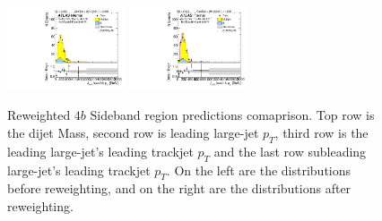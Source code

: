 \begin{figure}[htbp!]
\begin{center}
\includegraphics[width=0.31\textwidth,angle=-90]{figures/boosted/Prereweight/Moriond_FourTag_Sideband_sublHCand_trk0_Pt.pdf}
\includegraphics[width=0.31\textwidth,angle=-90]{figures/boosted/Sideband/b77_FourTag_Sideband_sublHCand_trk0_Pt.pdf}\\
\caption{Reweighted $4b$ Sideband region predictions comaprison. Top row is the dijet Mass, second row is leading large-\R jet $p_{T}$, third row is the leading large-\R jet's leading trackjet $p_T$ and the last row subleading large-\R jet's leading trackjet $p_T$. On the left are the distributions before reweighting, and on the right are the distributions after reweighting.}
\label{fig:rw-4b-comp-sb}
\end{center}
\end{figure}




